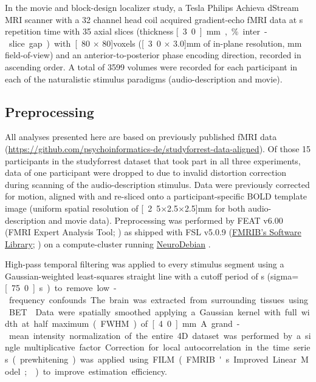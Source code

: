 \documentclass[english]{article}
\begin{document}
In the movie and block-design localizer study, a \unit[3]{Tesla} Philips Achieva dStream
MRI scanner with a 32 channel head coil acquired gradient-echo fMRI data
at \unit[2]{s} repetition time with
35 axial slices (thickness \unit[3.0]{mm}, \unit[10]{\%} inter-slice gap) with
\unit[80 $\times$ 80]{voxels} (\unit[3.0 $\times$ 3.0]{mm} of in-plane
resolution, \unit[240]{mm} field-of-view) and an anterior-to-posterior phase
encoding direction, recorded in ascending order.
A total of 3599 volumes were recorded for each participant in each of the
naturalistic stimulus paradigms (audio-description and movie).

\subsection{Preprocessing}

All analyses presented here are based on previously published fMRI data
(\url{https://github.com/psychoinformatics-de/studyforrest-data-aligned}).
Of those 15 participants in the studyforrest dataset that took
part in all three experiments,
data of one participant were dropped to due to invalid distortion correction
during scanning of the audio-description stimulus.
Data were previously corrected for motion, aligned with and re-sliced onto a
participant-specific BOLD template image \citep{sengupta2016extension}
(uniform spatial resolution of \unit[2.5$\times$2.5$\times$2.5]{mm} for both
audio-description and movie data).
Preprocessing was performed by FEAT v6.00 (FMRI Expert Analysis Tool;
\citep{woolrich2001autocorr}) as shipped with
FSL v5.0.9 (\href{https://www.fmrib.ox.ac.uk/fsl}{FMRIB's Software Library};
\citep{smith2004fsl}) on a compute-cluster running
\href{http://neuro.debian.net}{NeuroDebian} \citep{halchenko2012open}.

High-pass temporal filtering was applied to every stimulus segment using a
Gaussian-weighted least-squares straight line with a cutoff period of
\unit[150]{s} (sigma=\unit[75.0]{s}) to remove low-frequency confounds.
The brain was extracted from surrounding tissues using BET \citep{smith2002bet}.
Data were spatially smoothed applying a Gaussian kernel with full width at half
maximum (FWHM) of \unit[4.0]{mm}.
A grand-mean intensity normalization of the entire 4D dataset was performed by a
single multiplicative factor.
Correction for local autocorrelation in the time series (prewhitening) was
applied using FILM (FMRIB's Improved Linear Model; \citep{woolrich2001autocorr})
to improve estimation efficiency.
\end{document}
